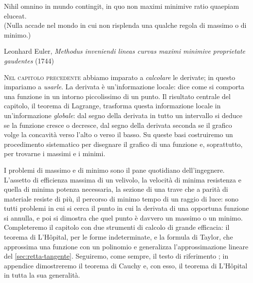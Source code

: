 
\epigraph{Nihil omnino in mundo contingit, in quo non maximi minimive ratio quaepiam
eluceat.\\[2pt]
\upshape(Nulla accade nel mondo in cui non risplenda una qualche regola di massimo o di
minimo.)}{Leonhard Euler, \emph{Methodus inveniendi lineas curvas maximi minimive
proprietate gaudentes} (1744)}

\lettrine[lines=3, findent=2pt, nindent=0pt]{N}{el capitolo precedente} abbiamo
imparato a \emph{calcolare} le derivate; in questo impariamo a \emph{usarle}. La
derivata è un'informazione locale: dice come si comporta una funzione in un intorno
piccolissimo di un punto. Il risultato centrale del capitolo, il teorema di Lagrange,
trasforma questa informazione locale in un'informazione \emph{globale}: dal segno della
derivata in tutto un intervallo si deduce se la funzione cresce o decresce, dal segno
della derivata seconda se il grafico volge la concavità verso l'alto o verso il basso.
Su queste basi costruiremo un procedimento sistematico per disegnare il grafico di una
funzione e, soprattutto, per trovarne i massimi e i minimi.

I problemi di massimo e di minimo sono il pane quotidiano dell'ingegnere. L'assetto di
efficienza massima di un velivolo, la velocità di minima resistenza e quella di minima
potenza necessaria, la sezione di una trave che a parità di materiale resiste di più,
il percorso di minimo tempo di un raggio di luce: sono tutti problemi in cui si cerca il
punto in cui la derivata di una opportuna funzione si annulla, e poi si dimostra che
quel punto è davvero un massimo o un minimo. Completeremo il capitolo con due strumenti
di calcolo di grande efficacia: il teorema di L'Hôpital, per le forme indeterminate, e
la formula di Taylor, che approssima una funzione con un polinomio e generalizza
l'approssimazione lineare del \cref{sec:retta-tangente}. Seguiremo, come sempre, il
testo di riferimento \cite{marcellini-sbordone}; in appendice dimostreremo il teorema
di Cauchy e, con esso, il teorema di L'Hôpital in tutta la sua generalità.

